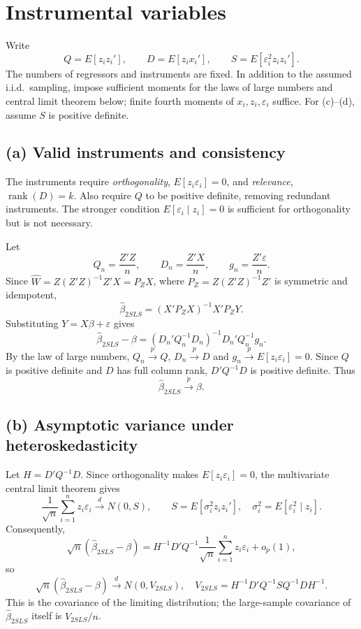 \section{Instrumental variables}
Write
\[
Q=E[z_i z_i'],\qquad D=E[z_i x_i'],\qquad
S=E[\varepsilon_i^2z_i z_i'].
\]
The numbers of regressors and instruments are fixed. In addition to the
assumed i.i.d.\ sampling, impose sufficient moments for the laws of large
numbers and central limit theorem below; finite fourth moments of
$x_i,z_i,\varepsilon_i$ suffice. For (c)--(d), assume $S$ is positive definite.

\subsection*{(a) Valid instruments and consistency}
The instruments require \emph{orthogonality}, $E[z_i\varepsilon_i]=0$,
and \emph{relevance}, $\operatorname{rank}(D)=k$.
Also require $Q$ to be positive definite, removing redundant instruments.
The stronger condition $E[\varepsilon_i\mid z_i]=0$ is sufficient for
orthogonality but is not necessary.

Let
\[
Q_n=\frac{Z'Z}{n},\qquad D_n=\frac{Z'X}{n},\qquad
g_n=\frac{Z'\varepsilon}{n}.
\]
Since $\widehat W=Z(Z'Z)^{-1}Z'X=P_ZX$, where
$P_Z=Z(Z'Z)^{-1}Z'$ is symmetric and idempotent,
\[
\widehat\beta_{2SLS}
=(X'P_ZX)^{-1}X'P_ZY.
\]
Substituting $Y=X\beta+\varepsilon$ gives
\[
\widehat\beta_{2SLS}-\beta
=(D_n'Q_n^{-1}D_n)^{-1}D_n'Q_n^{-1}g_n.
\]
By the law of large numbers,
$Q_n\xrightarrow{p}Q$, $D_n\xrightarrow{p}D$ and
$g_n\xrightarrow{p}E[z_i\varepsilon_i]=0$.
Since $Q$ is positive definite and $D$ has full column rank,
$D'Q^{-1}D$ is positive definite. Thus
\[
\boxed{\widehat\beta_{2SLS}\xrightarrow{p}\beta.}
\]

\subsection*{(b) Asymptotic variance under heteroskedasticity}
Let $H=D'Q^{-1}D$. Since orthogonality makes $E[z_i\varepsilon_i]=0$,
the multivariate central limit theorem gives
\[
\frac1{\sqrt n}\sum_{i=1}^n z_i\varepsilon_i
\xrightarrow{d}N(0,S),\qquad
S=E[\sigma_i^2z_i z_i'],\quad
\sigma_i^2=E[\varepsilon_i^2\mid z_i].
\]
Consequently,
\[
\sqrt n(\widehat\beta_{2SLS}-\beta)
=
H^{-1}D'Q^{-1}
\frac1{\sqrt n}\sum_{i=1}^n z_i\varepsilon_i+o_p(1),
\]
so
\[
\boxed{
\sqrt n(\widehat\beta_{2SLS}-\beta)\xrightarrow{d}N(0,V_{2SLS}),
\quad
V_{2SLS}=H^{-1}D'Q^{-1}SQ^{-1}DH^{-1}.
}
\]
This is the covariance of the limiting distribution; the large-sample
covariance of $\widehat\beta_{2SLS}$ itself is $V_{2SLS}/n$.

